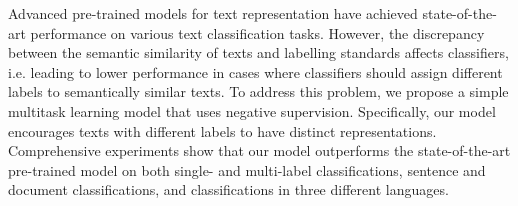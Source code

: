 Advanced pre-trained models for text representation have achieved state-of-the-art performance on various text classification tasks. However, the discrepancy between the semantic similarity of texts and labelling standards affects classifiers, i.e. leading to lower performance in cases where classifiers should assign different labels to semantically similar texts. To address this problem, we propose a simple multitask learning model that uses negative supervision. Specifically, our model encourages texts with different labels to have distinct representations. Comprehensive experiments show that our model outperforms the state-of-the-art pre-trained model on both single- and multi-label classifications, sentence and document classifications, and classifications in three different languages.
